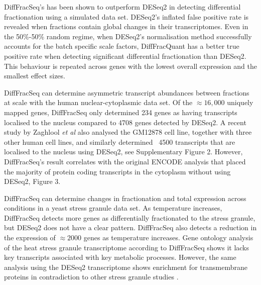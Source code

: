 \documentclass[../main.tex]{subfiles}
\begin{document}
DiffFracSeq's has been shown to outperform DESeq2 in detecting differential fractionation using a simulated data set.
DESeq2's inflated false positive rate is revealed when fractions contain global changes in their transcriptomes.
Even in the 50\%-50\% random regime, when DESeq2's normalisation method successfully accounts for the batch specific scale factors, DiffFracQuant has a better true positive rate when detecting significant differential fractionation than DESeq2.
This behaviour is repeated across genes with the lowest overall expression and the smallest effect sizes.

DiffFracSeq can determine asymmetric transcript abundances between fractions at scale with the human nuclear-cytoplasmic data set.
Of the $\approx16,000$ uniquely mapped genes, DiffFracSeq only determined 234 genes as having transcripts localised to the nucleus compared to 4708 genes detected by DESeq2.
A recent study by Zaghlool \textit{et al} also analysed the GM12878 cell line, together with three other human cell lines, and similarly determined ~4500 transcripts that are localised to the nucleus using DESeq2, see \parencite{Zaghlool2021} Supplementary Figure 2. 
However, DiffFracSeq's result correlates with the original ENCODE analysis that placed the majority of protein coding transcripts in the cytoplasm without using DESeq2, \parencite{Djebali2012} Figure 3.

DiffFracSeq can determine changes in fractionation and total expression across conditions in a yeast stress granule data set.
As temperature increases, DiffFracSeq detects more genes as differentially fractionated to the stress granule, but DESeq2 does not have a clear pattern.
DiffFracSeq also detects a reduction in the expression of $\approx2000$ genes as temperature increases.
Gene ontology analysis of the heat stress granule transcriptome according to DiffFracSeq shows it lacks key transcripts associated with key metabolic processes.
However, the same analysis using the DESeq2 transcriptome shows enrichment for transmembrane proteins in contradiction to other stress granule studies \parencite{Unworth2010, Khong2017}.
\end{document}
